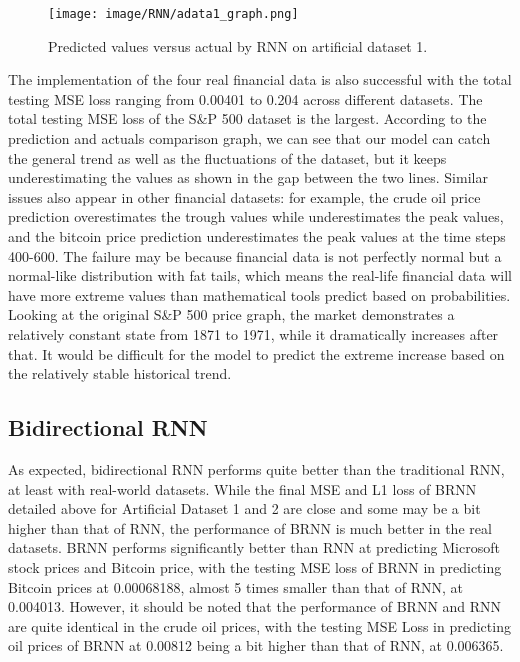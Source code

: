 \documentclass[letterpaper, 10 pt, conference]{ieeeconf}  %
\begin{document}
        \begin{figure}[thpb]
            \centering
             \texttt{[image: image/RNN/adata1\_graph.png]}
            \caption{Predicted values versus actual by RNN on artificial dataset 1.}
            \label{figurelabel}
        \end{figure}

        The implementation of the four real financial data is also successful with the total testing MSE loss ranging from 0.00401 to 0.204 across different datasets. The total testing MSE loss of the S\&P 500 dataset is the largest. According to the prediction and actuals comparison graph, we can see that our model can catch the general trend as well as the fluctuations of the dataset, but it keeps underestimating the values as shown in the gap between the two lines. Similar issues also appear in other financial datasets: for example, the crude oil price prediction overestimates the trough values while underestimates the peak values, and the bitcoin price prediction underestimates the peak values at the time steps 400-600. The failure may be because financial data is not perfectly normal but a normal-like distribution with fat tails, which means the real-life financial data will have more extreme values than mathematical tools predict based on probabilities. Looking at the original S\&P 500 price graph, the market demonstrates a relatively constant state from 1871 to 1971, while it dramatically increases after that. It would be difficult for the model to predict the extreme increase based on the relatively stable historical trend. 


    \subsection{Bidirectional RNN}

        As expected, bidirectional RNN performs quite better than the traditional RNN, at least with real-world datasets. While the final MSE and L1 loss of BRNN detailed above for Artificial Dataset 1 and 2 are close and some may be a bit higher than that of RNN, the performance of BRNN is much better in the real datasets. BRNN performs significantly better than RNN at predicting Microsoft stock prices and Bitcoin price, with the testing MSE loss of BRNN in predicting Bitcoin prices at 0.00068188, almost 5 times smaller than that of RNN, at 0.004013. However, it should be noted that the performance of BRNN and RNN are quite identical in the crude oil prices, with the testing MSE Loss in predicting oil prices of BRNN at 0.00812 being a bit higher than that of RNN, at 0.006365.
\end{document}

